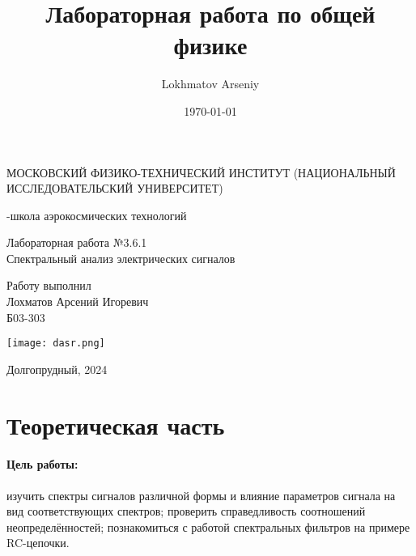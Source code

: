 \documentclass[a4paper,12pt]{article} %
\author{Lokhmatov Arseniy}
\title{Лабораторная работа по общей физике}
\date{\today}
\begin{document}
\begin{titlepage}
    \newpage
    \begin{center}
    {\large МОСКОВСКИЙ ФИЗИКО-ТЕХНИЧЕСКИЙ ИНСТИТУТ (НАЦИОНАЛЬНЫЙ ИССЛЕДОВАТЕЛЬСКИЙ УНИВЕРСИТЕТ)}
    \vspace{1cm}

    {-школа аэрокосмических технологий}
    \vspace{6em}
    \end{center}
    
    \vspace{1.2em}

    \begin{center}
    \Large Лабораторная работа №3.6.1 \\
    Спектральный анализ электрических сигналов
    \linebreak
    \end{center}
    
    \vspace{11em}
    
    \begin{flushright}
                       {\large Работу выполнил\\
                       Лохматов Арсений Игоревич\\
                       Б03-303 }
    \end{flushright}

    \vspace{\fill}

    \begin{center}
        \texttt{[image: dasr.png]}
    \end{center}

    \begin{center}
    Долгопрудный, 2024
    \end{center}

    \end{titlepage}

\section{Теоретическая часть}

\paragraph{Цель работы:} изучить спектры сигналов различной формы и влияние параметров сигнала на вид соответствующих спектров; проверить справедливость соотношений неопределённостей; познакомиться с работой спектральных фильтров на примере RC-цепочки.
\end{document}
